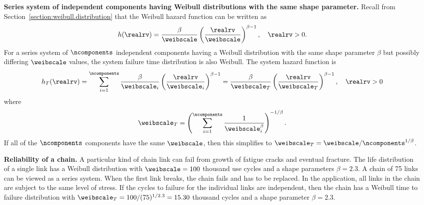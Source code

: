 \noindent
{\bf Series system of independent components having Weibull distributions with the
same shape parameter.}
Recall from Section~\ref{section:weibull.distribution} that the
Weibull hazard function can be written as
\begin{displaymath}
 h(\realrv) = \frac{\beta}{\weibscale}
\left (\frac{\realrv}{\weibscale} \right )^{\beta-1},  \quad \realrv > 0.
\end{displaymath}
For a series system of $\ncomponents$ independent components having a Weibull
distribution with the same shape parameter
$\beta$
but possibly differing $\weibscale$ values, the system 
failure time distribution is also Weibull. The system hazard function is
\begin{displaymath}
 h_{T}(\realrv) = \sum_{i=1}^{\ncomponents}\frac{\beta}{\weibscale_{i}}
\left (\frac{\realrv}{\weibscale_{i}} \right )^{\beta-1}=\frac{\beta}{\weibscale_{T}}
\left (\frac{\realrv}{\weibscale_{T}} \right )^{\beta-1} ,  \quad \realrv > 0
\end{displaymath}
where
\begin{displaymath}
\weibscale_{T} = \left( \sum_{i=1}^{\ncomponents} 
	\frac{1}{\weibscale_{i}^{\beta}}\right)^{-1/\beta}.
\end{displaymath}
If all of the $\ncomponents$ components have the same $\weibscale$,
then this simplifies to $\weibscale_{T} =
\weibscale/\ncomponents^{1/\beta}$.

\begin{example}
{\bf Reliability of a chain.}  A particular kind of chain link can
fail from growth of fatigue cracks and eventual fracture. The life
distribution of a single link has a Weibull distribution with
$\weibscale=100$ thousand use cycles and a shape parameters
$\beta=2.3$. A chain of 75 links can be viewed as a series
system. When the first link breaks, the chain fails and has to be
replaced. In the application, all links in the chain are subject to
the same level of stress. If the cycles to failure for the
individual links are independent, then the chain has a Weibull time
to failure distribution with $\weibscale_{T} =
100/(75)^{1/2.3}=15.30$ thousand cycles and a shape parameter
$\beta=2.3$.
\end{example}


